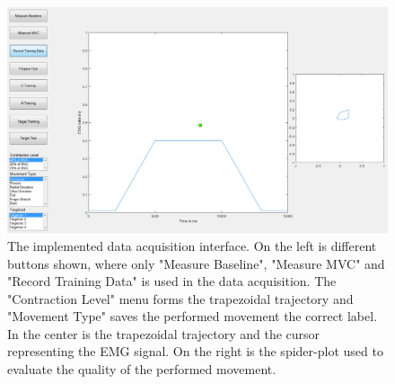 \begin{figure}[H] 
	\includegraphics[width=1\textwidth]{figures/xBackground/dataacqGUI}
	\caption{The implemented data acquisition interface. On the left is different buttons shown, where only "Measure Baseline", "Measure MVC" and "Record Training Data" is used in the data acquisition. The "Contraction Level" menu forms the trapezoidal trajectory and "Movement Type" saves the performed movement the correct label. In the center is the trapezoidal trajectory and the cursor representing the EMG signal. On the right is the spider-plot used to evaluate the quality of the performed movement.}
	\label{fig:GUIplot}
\end{figure}
